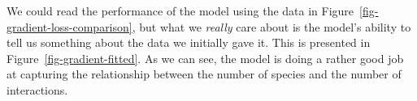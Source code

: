 \documentclass[
  letterpaper,
]{scrbook}
\begin{document}
We could read the performance of the model using the data in
Figure~\ref{fig-gradient-loss-comparison}, but what we \emph{really}
care about is the model's ability to tell us something about the data we
initially gave it. This is presented in
Figure~\ref{fig-gradient-fitted}. As we can see, the model is doing a
rather good job at capturing the relationship between the number of
species and the number of interactions.

\begin{figure}[pbt]

\end{figure}
\end{document}
